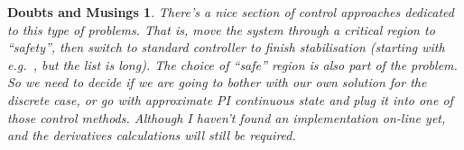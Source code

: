 \documentclass{article}
\newtheorem{doubt}{Doubts and Musings}
\begin{document}
\begin{doubt}
There's a nice section of control approaches dedicated to this type of
problems. That is, move the system through a critical region to
``safety'', then switch to standard controller to finish stabilisation
(starting with e.g.~\cite{yanushevsky_91}, but the list is long). The
choice of ``safe'' region is also part of the problem. So we need to
decide if we are going to bother with our own solution for the
discrete case, or go with approximate PI continuous state and plug it
into one of those control methods. Although I haven't found an
implementation on-line yet, and the derivatives calculations will
still be required.
\end{doubt}



\end{document}
